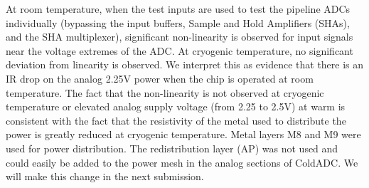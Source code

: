\label{sec:5.6}

%
%

At room temperature, when the test inputs are used to test the pipeline ADCs individually (bypassing the input buffers, Sample and Hold Amplifiers (SHAs), and the SHA multiplexer), significant non-linearity is observed for input signals near the voltage extremes of the ADC.  At cryogenic temperature, no significant deviation from linearity is observed.  We interpret this as evidence that there is an IR drop on the analog 2.25V power when the chip is operated at room temperature.  The fact that the non-linearity is not observed at cryogenic temperature or elevated analog supply voltage (from 2.25 to 2.5V) at warm is consistent with the fact that the resistivity of the metal used to distribute the power is greatly reduced at cryogenic temperature. 
Metal layers M8 and M9 were used for power distribution.  The redistribution layer (AP) was not used and could easily be added to the power mesh in the analog sections of ColdADC.  We will make this change in the next submission.
